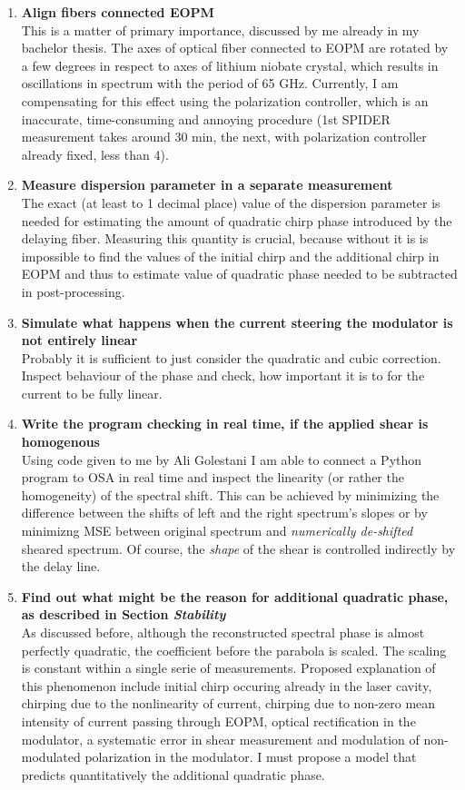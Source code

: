 \documentclass{article}
\begin{document}
\begin{enumerate}
\item \textbf{Align fibers connected EOPM}\\
This is a matter of primary importance, discussed by me already in my bachelor thesis. The axes of optical fiber connected to EOPM are rotated by a few degrees in respect to axes of lithium niobate crystal, which results in oscillations in spectrum with the period of 65 GHz. Currently, I am compensating for this effect using the polarization controller, which is an inaccurate, time-consuming and annoying procedure (1st SPIDER measurement takes around 30 min, the next, with polarization controller already fixed, less than 4).

\item \textbf{Measure dispersion parameter in a separate measurement}\\
The exact (at least to 1 decimal place) value of the dispersion parameter is needed for estimating the amount of quadratic chirp phase introduced by the delaying fiber. Measuring this quantity is crucial, because without it is is impossible to find the values of the initial chirp and the additional chirp in EOPM and thus to estimate value of quadratic phase needed to be subtracted in post-processing.

\item \textbf{Simulate what happens when the current steering the modulator is not entirely linear}\\
Probably it is sufficient to just consider the quadratic and cubic correction. Inspect behaviour of the phase and check, how important it is to for the current to be fully linear.

\item \textbf{Write the program checking in real time, if the applied shear is homogenous}\\
Using code given to me by Ali Golestani I am able to connect a Python program to OSA in real time and inspect the linearity (or rather the homogeneity) of the spectral shift. This can be achieved by minimizing the difference between the shifts of left and the right spectrum's slopes or by minimizng MSE between original spectrum and \emph{numerically de-shifted} sheared spectrum. Of course, the \emph{shape} of the shear is controlled indirectly by the delay line.

\item \textbf{Find out what might be the reason for additional quadratic phase, as described in Section \emph{Stability}}\\
As discussed before, although the reconstructed spectral phase is almost perfectly quadratic, the coefficient before the parabola is scaled. The scaling is constant within a single serie of measurements. Proposed explanation of this phenomenon include initial chirp occuring already in the laser cavity, chirping due to the nonlinearity of current, chirping due to non-zero mean intensity of current passing through EOPM, optical rectification in  the modulator, a systematic error in shear measurement and modulation of non-modulated polarization in the modulator. I must propose a model that predicts quantitatively the additional quadratic phase.


\end{enumerate}
\end{document}
